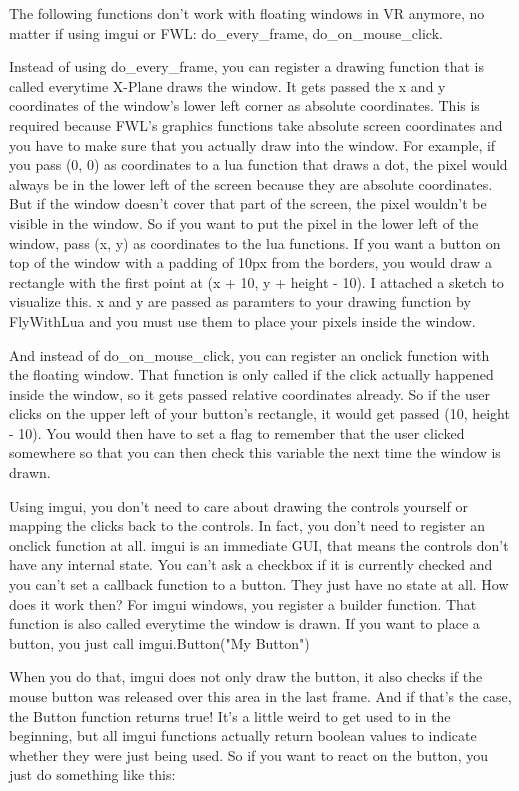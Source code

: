 \documentclass[11pt,parskip=half,a4paper]{scrartcl}
\begin{document}
\newpage
The following functions don't work with floating windows in VR anymore, no matter if using imgui or FWL: do\_every\_frame, do\_on\_mouse\_click.

Instead of using do\_every\_frame, you can register a drawing function that is called everytime X-Plane
draws the window. It gets passed the x and y coordinates of the window's lower left corner as absolute
coordinates. This is required because FWL's graphics functions take absolute screen coordinates and
you have to make sure that you actually draw into the window. For example, if you pass (0, 0) as
coordinates to a lua function that draws a dot, the pixel would always be in the lower left of
the screen because they are absolute coordinates. But if the window doesn't cover that part of the
screen, the pixel wouldn't be visible in the window. So if you want to put the pixel in the lower left of
the window, pass (x, y) as coordinates to the lua functions. If you want a button on top of the window
with a padding of 10px from the borders, you would draw a rectangle with the first point at (x + 10, y +
height - 10). I attached a sketch to visualize this. x and y are passed as paramters to your drawing
function by FlyWithLua and you must use them to place your pixels inside the window.

And instead of do\_on\_mouse\_click, you can register an onclick function with the floating window.
That function is only called if the click actually happened inside the window, so it gets passed relative
coordinates already. So if the user clicks on the upper left of your button's rectangle, it would get
passed (10, height - 10). You would then have to set a flag to remember that the user clicked
somewhere so that you can then check this variable the next time the window is drawn.

Using imgui, you don't need to care about drawing the controls yourself or mapping the clicks back to
the controls. In fact, you don't need to register an onclick function at all. imgui is an immediate GUI,
that means the controls don't have any internal state. You can't ask a checkbox if it is currently checked
and you can't set a callback function to a button. They just have no state at all. How does it work then?
For imgui windows, you register a builder function. That function is also called everytime the window
is drawn. If you want to place a button, you just call
imgui.Button("My Button")

When you do that, imgui does not only draw the button, it also checks if the mouse button was released
over this area in the last frame. And if that's the case, the Button function returns true! It's a little weird
to get used to in the beginning, but all imgui functions actually return boolean values to indicate
whether they were just being used. So if you want to react on the button, you just do something like
this:
\end{document}
